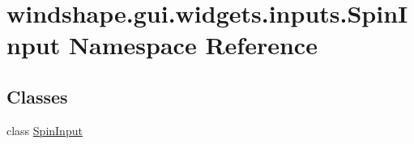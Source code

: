 \hypertarget{namespacewindshape_1_1gui_1_1widgets_1_1inputs_1_1_spin_input}{}\section{windshape.\+gui.\+widgets.\+inputs.\+Spin\+Input Namespace Reference}
\label{namespacewindshape_1_1gui_1_1widgets_1_1inputs_1_1_spin_input}
\subsection*{Classes}
\begin{DoxyCompactItemize}
\item 
class \mbox{\hyperlink{classwindshape_1_1gui_1_1widgets_1_1inputs_1_1_spin_input_1_1_spin_input}{Spin\+Input}}
\end{DoxyCompactItemize}
